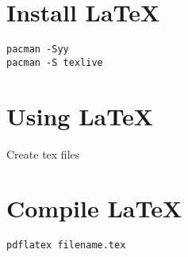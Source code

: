 \documentclass[a4paper,12pt]{book}
\begin{document}
\tableofcontents
\newpage

\chapter{Install \LaTeX}

\begin{lstlisting}
pacman -Syy
pacman -S texlive
\end{lstlisting}

\chapter{Using \LaTeX}

Create tex files

\chapter{Compile \LaTeX}

\begin{lstlisting}
pdflatex filename.tex
\end{lstlisting}
\end{document}
